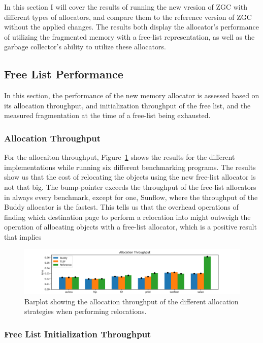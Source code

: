 
In this section I will cover the results of running the new vresion of ZGC with different types of allocators, and compare them to the reference version of ZGC without the applied changes. The results both display the allocator's performance of utilizing the fragmented memory with a free-list representation, as well as the garbage collector's ability to utilize these allocators.

\subsection{Free List Performance}
In this section, the performance of the new memory allocator is assessed based on its allocation throughput, and initialization throughput of the free list, and the measured fragmentation at the time of a free-list being exhausted.

\subsubsection{Allocation Throughput}
For the allocaiton throughput, Figure~\ref*{fig:allocation-throughput} shows the results for the different implementations while running six different benchmarking programs. The results show us that the cost of relocating the objects using the new free-list allocator is not that big. The bump-pointer exceeds the throughput of the free-list allocators in always every benchmark, except for one, Sunflow, where the throughput of the Buddy allocator is the fastest. This tells us that the overhead operations of finding which destination page to perform a relocation into might outweigh the operation of allocating objects with a free-list allocator, which is a positive result that implies 

\begin{figure}[H]
\centering
\includegraphics[width=1\textwidth]{figures/allocation_throughput.png}
\caption{Barplot showing the allocation throughput of the different allocation strategies when performing relocations.}
\label{fig:allocation-throughput}
\end{figure}

\subsubsection{Free List Initialization Throughput}

